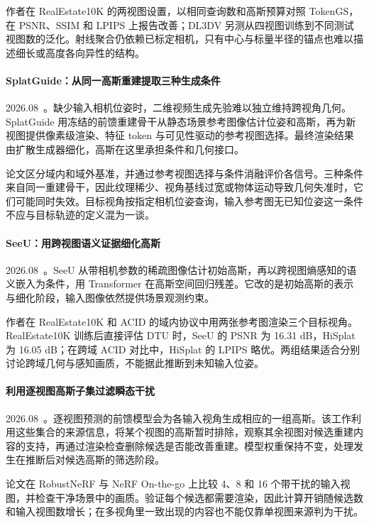 作者在 RealEstate10K 的两视图设置，以相同查询数和高斯预算对照 TokenGS，在 PSNR、SSIM 和 LPIPS 上报告改善；DL3DV 另测从四视图训练到不同测试视图数的泛化。射线聚合仍依赖已标定相机，只有中心与标量半径的锚点也难以描述细长或高度各向异性的结构。

\paragraph{SplatGuide：从同一高斯重建提取三种生成条件}
2026.08~\cite{2608_16863}。缺少输入相机位姿时，二维视频生成先验难以独立维持跨视角几何。SplatGuide 用冻结的前馈重建骨干从静态场景参考图像估计位姿和高斯，再为新视图提供像素级渲染、特征 token 与可见性驱动的参考视图选择。最终渲染结果由扩散生成器细化，高斯在这里承担条件和几何接口。

论文区分域内和域外基准，并通过参考视图选择与条件消融评价各信号。三种条件来自同一重建骨干，因此纹理稀少、视角基线过宽或物体运动导致几何失准时，它们可能同时失效。目标视角按指定相机位姿查询，输入参考图无已知位姿这一条件不应与目标轨迹的定义混为一谈。

\paragraph{SeeU：用跨视图语义证据细化高斯}
2026.08~\cite{2608_22740}。SeeU 从带相机参数的稀疏图像估计初始高斯，再以跨视图熵感知的语义嵌入为条件，用 Transformer 在高斯空间回归残差。它改的是初始高斯的表示与细化阶段，输入图像依然提供场景观测约束。

作者在 RealEstate10K 和 ACID 的域内协议中用两张参考图渲染三个目标视角。RealEstate10K 训练后直接评估 DTU 时，SeeU 的 PSNR 为 16.31 dB，HiSplat 为 16.05 dB；在跨域 ACID 对比中，HiSplat 的 LPIPS 略优。两组结果适合分别讨论跨域几何与感知画质，不能据此推断到未知输入位姿。

\paragraph{利用逐视图高斯子集过滤瞬态干扰}
2026.08~\cite{2608_26951}。逐视图预测的前馈模型会为各输入视角生成相应的一组高斯。该工作利用这些集合的来源信息，将某个视图的高斯暂时排除，观察其余视图对候选重建内容的支持，再通过渲染检查删除候选是否能改善重建。模型权重保持不变，处理发生在推断后对候选高斯的筛选阶段。

论文在 RobustNeRF 与 NeRF On-the-go 上比较 4、8 和 16 个带干扰的输入视图，并检查干净场景中的画质。验证每个候选都需要渲染，因此计算开销随候选数和输入视图数增长；在多视角里一致出现的内容也不能仅靠单视图来源判为干扰。

